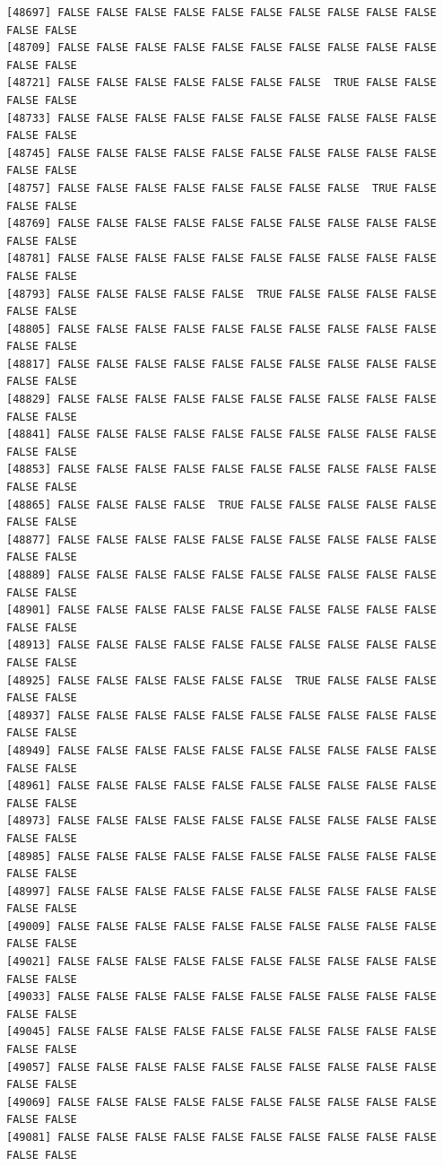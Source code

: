 \documentclass[
  a4paper,
  DIV=11,
  numbers=noendperiod]{scrartcl}
\begin{document}
\begin{verbatim}
[48697] FALSE FALSE FALSE FALSE FALSE FALSE FALSE FALSE FALSE FALSE FALSE FALSE
[48709] FALSE FALSE FALSE FALSE FALSE FALSE FALSE FALSE FALSE FALSE FALSE FALSE
[48721] FALSE FALSE FALSE FALSE FALSE FALSE FALSE  TRUE FALSE FALSE FALSE FALSE
[48733] FALSE FALSE FALSE FALSE FALSE FALSE FALSE FALSE FALSE FALSE FALSE FALSE
[48745] FALSE FALSE FALSE FALSE FALSE FALSE FALSE FALSE FALSE FALSE FALSE FALSE
[48757] FALSE FALSE FALSE FALSE FALSE FALSE FALSE FALSE  TRUE FALSE FALSE FALSE
[48769] FALSE FALSE FALSE FALSE FALSE FALSE FALSE FALSE FALSE FALSE FALSE FALSE
[48781] FALSE FALSE FALSE FALSE FALSE FALSE FALSE FALSE FALSE FALSE FALSE FALSE
[48793] FALSE FALSE FALSE FALSE FALSE  TRUE FALSE FALSE FALSE FALSE FALSE FALSE
[48805] FALSE FALSE FALSE FALSE FALSE FALSE FALSE FALSE FALSE FALSE FALSE FALSE
[48817] FALSE FALSE FALSE FALSE FALSE FALSE FALSE FALSE FALSE FALSE FALSE FALSE
[48829] FALSE FALSE FALSE FALSE FALSE FALSE FALSE FALSE FALSE FALSE FALSE FALSE
[48841] FALSE FALSE FALSE FALSE FALSE FALSE FALSE FALSE FALSE FALSE FALSE FALSE
[48853] FALSE FALSE FALSE FALSE FALSE FALSE FALSE FALSE FALSE FALSE FALSE FALSE
[48865] FALSE FALSE FALSE FALSE  TRUE FALSE FALSE FALSE FALSE FALSE FALSE FALSE
[48877] FALSE FALSE FALSE FALSE FALSE FALSE FALSE FALSE FALSE FALSE FALSE FALSE
[48889] FALSE FALSE FALSE FALSE FALSE FALSE FALSE FALSE FALSE FALSE FALSE FALSE
[48901] FALSE FALSE FALSE FALSE FALSE FALSE FALSE FALSE FALSE FALSE FALSE FALSE
[48913] FALSE FALSE FALSE FALSE FALSE FALSE FALSE FALSE FALSE FALSE FALSE FALSE
[48925] FALSE FALSE FALSE FALSE FALSE FALSE  TRUE FALSE FALSE FALSE FALSE FALSE
[48937] FALSE FALSE FALSE FALSE FALSE FALSE FALSE FALSE FALSE FALSE FALSE FALSE
[48949] FALSE FALSE FALSE FALSE FALSE FALSE FALSE FALSE FALSE FALSE FALSE FALSE
[48961] FALSE FALSE FALSE FALSE FALSE FALSE FALSE FALSE FALSE FALSE FALSE FALSE
[48973] FALSE FALSE FALSE FALSE FALSE FALSE FALSE FALSE FALSE FALSE FALSE FALSE
[48985] FALSE FALSE FALSE FALSE FALSE FALSE FALSE FALSE FALSE FALSE FALSE FALSE
[48997] FALSE FALSE FALSE FALSE FALSE FALSE FALSE FALSE FALSE FALSE FALSE FALSE
[49009] FALSE FALSE FALSE FALSE FALSE FALSE FALSE FALSE FALSE FALSE FALSE FALSE
[49021] FALSE FALSE FALSE FALSE FALSE FALSE FALSE FALSE FALSE FALSE FALSE FALSE
[49033] FALSE FALSE FALSE FALSE FALSE FALSE FALSE FALSE FALSE FALSE FALSE FALSE
[49045] FALSE FALSE FALSE FALSE FALSE FALSE FALSE FALSE FALSE FALSE FALSE FALSE
[49057] FALSE FALSE FALSE FALSE FALSE FALSE FALSE FALSE FALSE FALSE FALSE FALSE
[49069] FALSE FALSE FALSE FALSE FALSE FALSE FALSE FALSE FALSE FALSE FALSE FALSE
[49081] FALSE FALSE FALSE FALSE FALSE FALSE FALSE FALSE FALSE FALSE FALSE FALSE

\end{verbatim}
\end{document}
